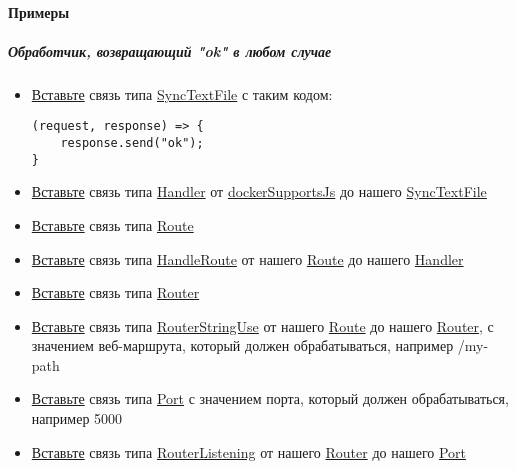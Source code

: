\documentclass{article}
\begin{document}
\paragraph{Примеры}
\subparagraph{Обработчик, возвращающий "ok" в любом случае}
\begin{itemize}
  \item \hyperlink{DeepCase.InsertLink.Description}{Вставьте} связь типа
        \hyperlink{Core.SyncTextFile.Description}{SyncTextFile} с таким
        кодом:
        \begin{lstlisting}
(request, response) => {
    response.send("ok");
}
\end{lstlisting}
  \item \hyperlink{DeepCase.InsertLink.Description}{Вставьте} связь типа
        \hyperlink{Core.Handler.Description}{Handler} от
        \hyperlink{Core.dockerSupportsJs.Description}{dockerSupportsJs}
        до нашего \hyperlink{Core.SyncTextFile.Description}{SyncTextFile}
  \item \hyperlink{DeepCase.InsertLink.Description}{Вставьте} связь типа
        \hyperlink{Core.Route.Description}{Route}
  \item \hyperlink{DeepCase.InsertLink.Description}{Вставьте} связь типа
        \hyperlink{Core.HandleRoute.Description}{HandleRoute} от нашего
        \hyperlink{Core.Route.Description}{Route} до нашего
        \hyperlink{Core.Handler.Description}{Handler}
  \item \hyperlink{DeepCase.InsertLink.Description}{Вставьте} связь типа
        \hyperlink{Core.Router.Description}{Router}
  \item \hyperlink{DeepCase.InsertLink.Description}{Вставьте} связь типа
        \hyperlink{Core.RouterStringUse.Description}{RouterStringUse} от
        нашего
        \hyperlink{Core.Route.Description}{Route} до нашего
        \hyperlink{Core.Router.Description}{Router},
        с
        значением
        веб-маршрута, который должен обрабатываться, например /my-path
  \item \hyperlink{DeepCase.InsertLink.Description}{Вставьте} связь типа
        \hyperlink{Core.Port.Description}{Port} с значением порта, который
        должен
        обрабатываться, например
        5000
  \item \hyperlink{DeepCase.InsertLink.Description}{Вставьте} связь типа
        \hyperlink{Core.RouterListening.Description}{RouterListening} от
        нашего
        \hyperlink{Core.Router.Description}{Router} до нашего
        \hyperlink{Core.Port.Description}{Port}
\end{itemize}
\end{document}
